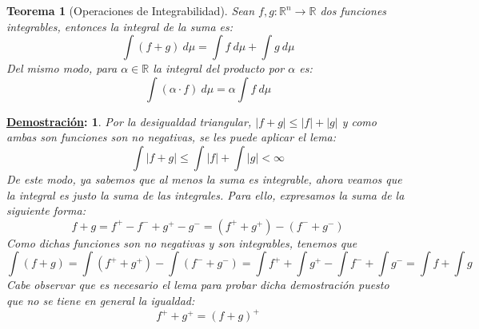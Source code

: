 \documentclass[10pt,a4paper,openright]{book}
\theoremstyle{break}
\newtheorem*{theo}{Teorema}
\newtheorem*{demo}{\underline{Demostración}:}
\newcommand{\dif}[1]{\ d#1}
\begin{document}
\begin{theo}[Operaciones de Integrabilidad]
Sean $f,g: \mathbb{R}^n \rightarrow \mathbb{R}$ dos funciones integrables, entonces la integral de la suma es:
$$\int (f+g) \dif{\mu} = \int f \dif{\mu} + \int g \dif{\mu}$$
Del mismo modo, para $\alpha \in \mathbb{R}$ la integral del producto por $\alpha$ es:
$$\int (\alpha \cdot f) \dif{\mu} = \alpha \int f \dif{\mu}$$
\end{theo}
\begin{demo}
Por la desigualdad triangular, $|f+g|\leq |f| + |g|$ y como ambas son funciones son no negativas, se les puede aplicar el lema:
$$\int |f+g| \leq \int |f| + \int |g| < \infty $$
De este modo, ya sabemos que al menos la suma es integrable, ahora veamos que la integral es justo la suma de las integrales. Para ello, expresamos la suma de la siguiente forma:
$$f+ g = f^+ - f^- + g^+ - g^- = (f^+ + g^+) - (f^- + g^-)$$
Como dichas funciones son  no negativas y son integrables, tenemos que
$$\int (f+g) = \int (f^+ + g^+) - \int (f^- + g^- ) = \int f^+ + \int g^+ - \int f^- +\int g^-  = \int f + \int g$$
Cabe observar que es necesario el lema para probar dicha demostración puesto que no se tiene en general la igualdad:
$$f^+ + g^+ = (f+g)^+$$
\end{demo}
\end{document}
